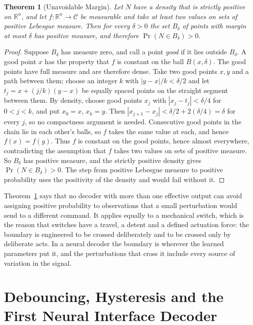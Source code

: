 \documentclass[11pt,twoside,openany]{book}
\newtheorem{theorem}{Theorem}[chapter]
\theoremstyle{definition}
\theoremstyle{remark}
\newcommand{\R}{\mathbb{R}}
\newcommand{\C}{\mathcal{C}}
\begin{document}
\begin{theorem}[Unavoidable Margin]\label{thm:margin}
Let $N$ have a density that is strictly positive on $\R^{n}$, and let $f:\R^{n}\to\C$ be measurable and take at least two values on sets of positive Lebesgue measure. Then for every $\delta>0$ the set $B_\delta$ of points with margin at most $\delta$ has positive measure, and therefore $\Pr(N\in B_\delta)>0$.
\end{theorem}
\begin{proof}
Suppose $B_\delta$ has measure zero, and call a point \emph{good} if it lies outside $B_\delta$. A good point $x$ has the property that $f$ is constant on the ball $B(x,\delta)$. The good points have full measure and are therefore dense. Take two good points $x,y$ and a path between them; choose an integer $k$ with $|y-x|/k<\delta/2$ and let $t_j=x+(j/k)(y-x)$ be equally spaced points on the straight segment between them. By density, choose good points $x_j$ with $|x_j-t_j|<\delta/4$ for $0<j<k$, and put $x_0=x$, $x_k=y$. Then $|x_{j+1}-x_j|<\delta/2+2(\delta/4)=\delta$ for every $j$, so no compactness argument is needed. Consecutive good points in the chain lie in each other's balls, so $f$ takes the same value at each, and hence $f(x)=f(y)$. Thus $f$ is constant on the good points, hence almost everywhere, contradicting the assumption that $f$ takes two values on sets of positive measure. So $B_\delta$ has positive measure, and the strictly positive density gives $\Pr(N\in B_\delta)>0$. The step from positive Lebesgue measure to positive probability uses the positivity of the density and would fail without it.
\end{proof}

Theorem~\ref{thm:margin} says that no decoder with more than one effective output can avoid assigning positive probability to observations that a small perturbation would send to a different command. It applies equally to a mechanical switch, which is the reason that switches have a travel, a detent and a defined actuation force: the boundary is engineered to be crossed deliberately and to be crossed only by deliberate acts. In a neural decoder the boundary is wherever the learned parameters put it, and the perturbations that cross it include every source of variation in the signal.

\section{Debouncing, Hysteresis and the First Neural Interface Decoder}
\end{document}
